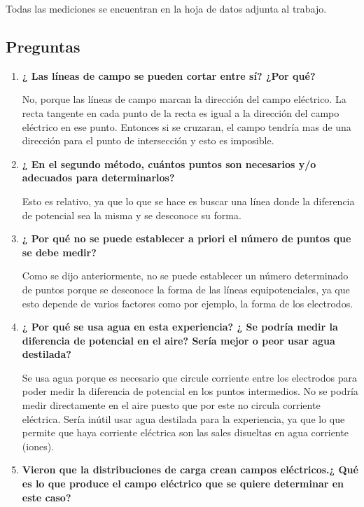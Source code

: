 \documentclass{article}
\begin{document}
 
 Todas las mediciones se encuentran en la hoja de datos adjunta al trabajo.

\subsection{Preguntas}
	\begin{enumerate}
    	\item \textbf{¿ Las líneas de campo se pueden cortar entre sí? ¿Por qué?}
        
        No, porque las líneas de campo marcan la dirección del campo eléctrico. La recta 
        tangente en cada punto de la recta es igual a la dirección del campo eléctrico en ese 
        punto. Entonces si se cruzaran, el campo tendría mas de una dirección para el punto de 
        intersección y esto es imposible.
        
        \item \textbf{¿ En el segundo método, cuántos puntos son necesarios y/o adecuados 
        para determinarlos?}
        
        Esto es relativo, ya que lo que se hace es buscar una línea donde la diferencia de 
        potencial sea la misma y se desconoce su forma.
        
        \item \textbf{¿ Por qué no se puede establecer a priori el número de puntos que se 
        debe medir? }
        
        Como se dijo anteriormente, no se puede establecer un número determinado
        de puntos porque se desconoce la forma de las líneas equipotenciales, ya que esto
        depende de varios factores como por ejemplo, la forma de los electrodos.
        
        \item \textbf{¿ Por qué se usa agua en esta experiencia? ¿ Se podría medir la 
        diferencia de potencial en el aire? Sería mejor o peor usar agua destilada?}
        
        Se usa agua porque es necesario que circule corriente entre los electrodos para poder 
        medir la diferencia de potencial en los puntos intermedios. No se podría medir 
        directamente en el aire puesto que por este no circula corriente eléctrica. Sería 
        inútil usar agua destilada para la experiencia, ya que lo que permite que haya 
        corriente eléctrica son las sales disueltas en agua corriente (iones).
        
        \item \textbf{Vieron que la distribuciones de carga crean campos eléctricos.¿ Qué es 
        lo que produce el campo eléctrico que se quiere determinar en este caso?}
        

\end{enumerate}
\end{document}
